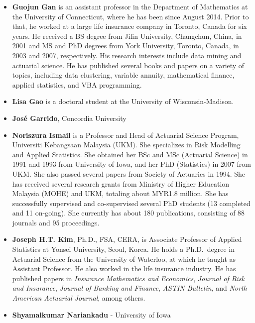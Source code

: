 \documentclass[]{book}
\providecommand{\tightlist}{%
  \setlength{\itemsep}{0pt}\setlength{\parskip}{0pt}}
\theoremstyle{definition}
\theoremstyle{definition}
\theoremstyle{definition}
\theoremstyle{remark}
\begin{document}
\begin{itemize}
\item
  \textbf{Guojun Gan} is an assistant professor in the Department of
  Mathematics at the University of Connecticut, where he has been since
  August 2014. Prior to that, he worked at a large life insurance
  company in Toronto, Canada for six years. He received a BS degree from
  Jilin University, Changchun, China, in 2001 and MS and PhD degrees
  from York University, Toronto, Canada, in 2003 and 2007, respectively.
  His research interests include data mining and actuarial science. He
  has published several books and papers on a variety of topics,
  including data clustering, variable annuity, mathematical finance,
  applied statistics, and VBA programming.
\item
  \textbf{Lisa Gao} is a doctoral student at the University of
  Wisconsin-Madison.
\item
  \textbf{José Garrido}, Concordia University
\end{itemize}

\begin{itemize}
\tightlist
\item
  \textbf{Noriszura Ismail} is a Professor and Head of Actuarial Science
  Program, Universiti Kebangsaan Malaysia (UKM). She specializes in Risk
  Modelling and Applied Statistics. She obtained her BSc and MSc
  (Actuarial Science) in 1991 and 1993 from University of Iowa, and her
  PhD (Statistics) in 2007 from UKM. She also passed several papers from
  Society of Actuaries in 1994. She has received several research grants
  from Ministry of Higher Education Malaysia (MOHE) and UKM, totaling
  about MYR1.8 million. She has successfully supervised and
  co-supervised several PhD students (13 completed and 11 on-going). She
  currently has about 180 publications, consisting of 88 journals and 95
  proceedings.
\end{itemize}

\begin{itemize}
\item
  \textbf{Joseph H.T. Kim}, Ph.D., FSA, CERA, is Associate Professor of
  Applied Statistics at Yonsei University, Seoul, Korea. He holds a
  Ph.D.~degree in Actuarial Science from the University of Waterloo, at
  which he taught as Assistant Professor. He also worked in the life
  insurance industry. He has published papers in \emph{Insurance
  Mathematics and Economics}, \emph{Journal of Risk and Insurance},
  \emph{Journal of Banking and Finance}, \emph{ASTIN Bulletin}, and
  \emph{North American Actuarial Journal}, among others.
\item
  \textbf{Shyamalkumar Nariankadu} - University of Iowa
\end{itemize}
\end{document}
